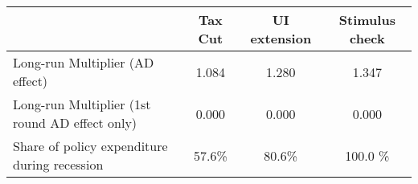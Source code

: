 \begin{tabular}{@{}lccc@{}}
\toprule
& Tax Cut    & UI extension    & Stimulus check    \\  \midrule
Long-run Multiplier (AD effect) &1.084  & 1.280  & 1.347     \\
Long-run Multiplier (1st round AD effect only) &0.000  & 0.000  & 0.000     \\
Share of policy expenditure during recession &57.6\%  & 80.6\%  & 100.0 \%    \\
\end{tabular}
